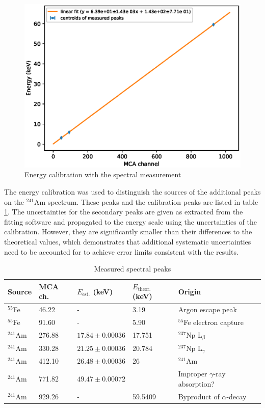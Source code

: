 \documentclass[a4paper]{article}
\begin{document}
\begin{figure}[ht!]
\centering
\includegraphics[width=\textwidth]{fig/python/spectral_calibration.eps}
\caption{Energy calibration with the spectral measurement}
\label{fig:spectral_calibration}
\end{figure}

\FloatBarrier
The energy calibration was used to distinguish the sources of the additional peaks on the $^{241}$Am spectrum.
These peaks and the calibration peaks are listed in table \ref{table:peaks}.
The uncertainties for the secondary peaks are given as extracted from the fitting software and propagated to the energy scale using the uncertainties of the calibration.
However, they are significantly smaller than their differences to the theoretical values, which demonstrates that additional systematic uncertainties need to be accounted for to achieve error limits consistent with the results.

\begin{table}[ht!]
\centering
\caption{Measured spectral peaks}
\begin{tabular}{lllll}
Source	& MCA ch.	& $E_\text{est.}$ (keV)	& $E_\text{theor.}$ (keV)	& Origin \\
\hline
$^{55}$Fe	& 46.22			& -			& 3.19 			& Argon escape peak \cite{winkler_gaseous_2015} \\
$^{55}$Fe	& 91.60			& -			& 5.90 			& $^{55}$Fe electron capture \cite{winkler_gaseous_2015} \\
$^{241}$Am	& 276.88			& $17.84\pm0.00036$		& 17.751			& $^{237}$Np L$_\beta$ \cites{maeda_peak_2015}{am241_spectrum} \\
$^{241}$Am	& 330.28			& $21.25\pm0.00036$		& 20.784			& $^{237}$Np L$_\gamma$ \cites{maeda_peak_2015}{am241_spectrum} \\
$^{241}$Am	& 412.10			& $26.48\pm0.00036$		& 26			& $^{241}$Am \cite{am241_spectrum} \\
$^{241}$Am	& 771.82			& $49.47\pm0.00072$		&				& Improper $\gamma$-ray absorption? \\
$^{241}$Am	& 929.26			& -			& 59.5409		& Byproduct of $\alpha$-decay \cite{winkler_gaseous_2015} \\
\end{tabular}
\label{table:peaks}
\end{table}
\end{document}
